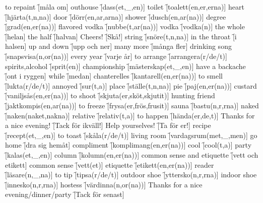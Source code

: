 \begin{questions}
\begin{multicols}{2}
        \question to repaint \f[måla om]
        \question outhouse \f[dass(et,\_,en)]
        \question toilet \f[toalett(en,er,erna)]
        \question heart \f[hjärta(t,n,na)]
        \question door \f[dörr(en,ar,arna)]
        \question shower \f[dusch(en,ar(na))]
        \question degree \f[grad(en,er(na))]
        \question flavored vodka \f[nubbe(t,ar(na))]
        \question vodka \f[vodka(n)]
        \question the whole \f[helan]
        \question the half \f[halvan]
        \question Cheers! \f[Skå!]
        \question string \f[snöre(t,n,na)]
        \question in the throat \f[i halsen]
        \question up and down \f[upp och ner]
        \question many more \f[många fler]
        \question drinking song \f[snapsvisa(n,or(na))]
        \question every year \f[varje år]
        \question to arrange \f[arrangera(r/de/t)]
        \question spirits,alcohol \f[sprit(en)]
        \question championship \f[mästerskap(et,\_,en)]
        \question have a backache \f[ont i ryggen]
        \question while \f[medan]
        \question chanterelles \f[kantarell(en,er(na))]
        \question to smell \f[lukta(r/de/t)]
        \question annoyed \f[sur(t,a)]
        \question place \f[ställe(t,n,na)]
        \question pie \f[paj(en,er(na))]
        \question custard \f[vaniljsås(en,er(na))]
        \question to shoot \f[skjuta(er,sköt,skjutit)]
        \question hunting friend \f[jaktkompis(en,ar(na))]
        \question to freeze \f[frysa(er,frös,frusit)]
        \question sauna \f[bastu(n,r,rna)]
        \question naked \f[naken(naket,nakna)]
        \question relative \f[relativ(t,a)]
        \question to happen \f[hända(er,de,t)]
        \question Thanks for a nice evening! \f[Tack för ikväll!]
        \question Help yourselves! \f[Ta för er!]
        \question recipe \f[recept(et,\_,en)]
        \question to toast \f[skåla(r/de/t)]
        \question living room \f[vardagsrum(met,\_,men)]
        \question go home \f[dra sig hemåt]
        \question compliment \f[komplimang(en,er(na))]
        \question cool \f[cool(t,a)]
        \question party \f[kalas(et,\_,en)]
        \question column \f[kolumn(en,er(na))]
        \question common sense and etiquette \f[vett och etikett]
        \question common sense \f[vett(et)]
        \question etiquette \f[etikett(en,er(na))]
        \question reader \f[läsare(n,\_,na)]
        \question to tip \f[tipsa(r/de/t)]
        \question outdoor shoe \f[yttersko(n,r,rna)]
        \question indoor shoe \f[innesko(n,r,rna)]
        \question hostess \f[värdinna(n,or(na))]
        \question Thanks for a nice evening/dinner/party \f[Tack för senast]

\end{multicols}
\end{questions}
